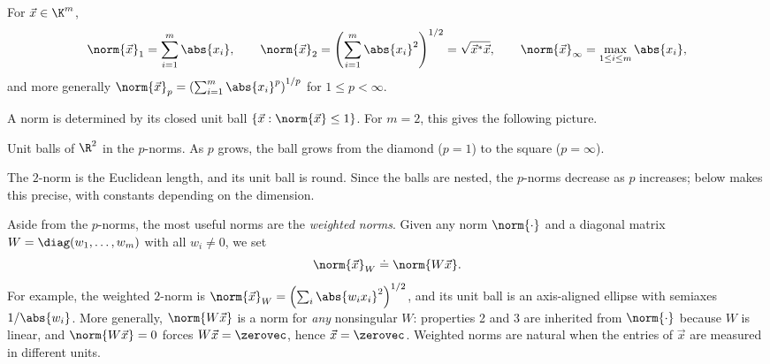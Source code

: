 \begin{definition}[$p$-Norms]
  For $\vec{x} \in \K^m$,
  \begin{equation}
    \norm{\vec{x}}_1 = \sum_{i=1}^{m}\abs{x_i}, \qquad \norm{\vec{x}}_2 = \left(\sum_{i=1}^{m}\abs{x_i}^2\right)^{1/2} = \sqrt{\vec{x}^\ast\vec{x}}, \qquad \norm{\vec{x}}_\infty = \max_{1 \le i \le m}\abs{x_i},
  \end{equation}
  and more generally $\norm{\vec{x}}_p = \left(\sum_{i=1}^{m}\abs{x_i}^p\right)^{1/p}$ for $1 \le p < \infty$.
\end{definition}

A norm is determined by its closed unit ball $\{\vec{x} : \norm{\vec{x}} \le 1\}$. For $m = 2$, this gives the following picture.

\begin{center}

\small Unit balls of $\R^2$ in the $p$-norms. As $p$ grows, the ball grows from the diamond ($p = 1$) to the square ($p = \infty$).
\end{center}

The $2$-norm is the Euclidean length, and its unit ball is round. Since the balls are nested, the $p$-norms decrease as $p$ increases;  below makes this precise, with constants depending on the dimension.

Aside from the $p$-norms, the most useful norms are the \emph{weighted norms}. Given any norm $\norm{\cdot}$ and a diagonal matrix $W = \diag(w_1, \dots, w_m)$ with all $w_i \ne 0$, we set
\begin{equation}
  \norm{\vec{x}}_W \doteq \norm{W\vec{x}}.
\end{equation}
For example, the weighted $2$-norm is $\norm{\vec{x}}_W = \left(\sum_i\abs{w_ix_i}^2\right)^{1/2}$, and its unit ball is an axis-aligned ellipse with semiaxes $1/\abs{w_i}$. More generally, $\norm{W\vec{x}}$ is a norm for \emph{any} nonsingular $W$: properties 2 and 3 are inherited from $\norm{\cdot}$ because $W$ is linear, and $\norm{W\vec{x}} = 0$ forces $W\vec{x} = \zerovec$, hence $\vec{x} = \zerovec$. Weighted norms are natural when the entries of $\vec{x}$ are measured in different units.

